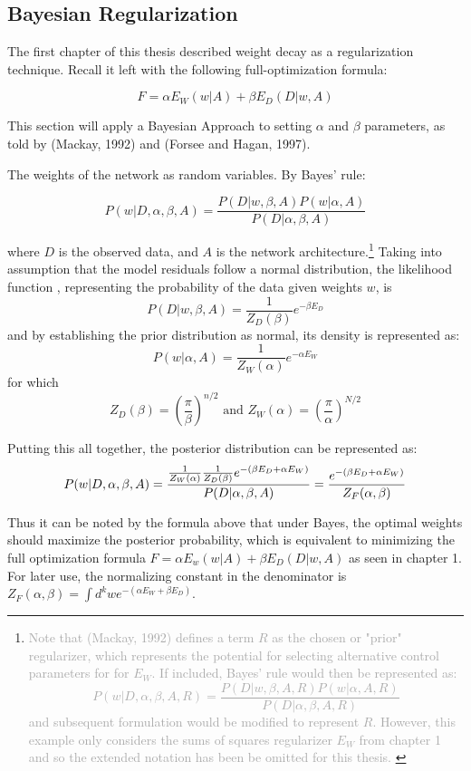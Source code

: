 \subsection{Bayesian Regularization}


The first chapter of this thesis described weight decay as a regularization technique.  Recall it left with the following full-optimization formula:

$$
F = \alpha E_W(w|A) + \beta E_D(D|w,A)
$$



This section will apply a Bayesian Approach to setting $\alpha$ and $\beta$ parameters, as told by (Mackay, 1992) \cite{mackay1992practical} and (Forsee and Hagan, 1997). \cite{foresee1997gauss}

The weights of the network as random variables. By Bayes' rule:
 
$$
P(w|D,\alpha,\beta,A) = \frac{P(D|w,\beta,A) P(w|\alpha,A)}{P(D|\alpha,\beta,A)}
$$

where $D$ is the observed data, and $A$ is the network architecture.\footnote{
\textcolor{darkgray}{
Note that (Mackay, 1992) defines a term $R$ as the chosen or "prior" regularizer, which represents the potential for selecting alternative control parameters for for $E_W$.  If included, Bayes' rule would then be represented  as:
$$
P(w|D,\alpha,\beta,A,R) = \frac{P(D|w,\beta,A,R) P(w|\alpha,A,R)}{P(D|\alpha,\beta,A,R)}
$$
 and subsequent formulation would be modified to represent $R$. However, this example only considers the sums of squares regularizer $E_W$ from chapter 1 and so the extended notation has been be omitted for this thesis.
 }}
Taking into assumption that the model residuals follow a normal distribution, the likelihood function \cite{foresee1997gauss}, representing the probability of the data given weights $w$, is
$$
P(D|w,\beta,A) = \frac{1}{Z_D(\beta)} e^{-\beta E_D}
$$
and by establishing the prior distribution as normal, its density is represented as:
$$
P(w|\alpha,A) = \frac{1}{Z_W(\alpha)} e^{-\alpha E_W}
$$
for which
$$
Z_D(\beta) = \left( \frac{\pi}{\beta} \right) ^{n/2} \text{ and }
Z_W(\alpha) = \left( \frac{\pi}{\alpha} \right) ^{N/2}
$$

Putting this all together, the posterior distribution can be represented as:
$$
P(w|D,\alpha,\beta,A) = \frac{\frac{1}{Z_W(\alpha)} \frac{1}{Z_D(\beta)} e^{-(\beta E_D + \alpha E_W)}}{P(D|\alpha,\beta,A)} \\
= \frac{e^{-(\beta E_D + \alpha E_W)}}{Z_F(\alpha,\beta)}
$$

Thus it can be noted by the formula above that under Bayes, the optimal weights should maximize the posterior probability, which is equivalent to minimizing the full optimization formula $F = \alpha E_w(w|A) + \beta E_D(D|w,A)$ as seen in chapter 1.  For later use, the normalizing constant in the denominator is $Z_F(\alpha,\beta) = \int d^k w e^{-(\alpha E_W + \beta E_D)}$.


